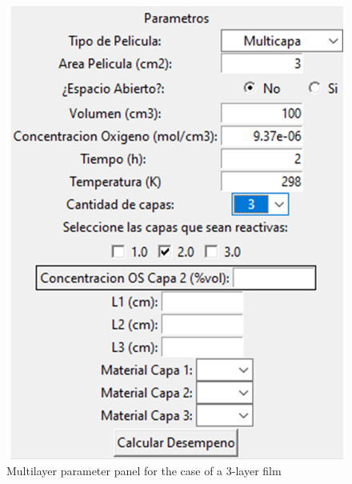 \begin{refsection}
\begin{figure}[H]
    \centering
    \includegraphics[scale=0.6]{Documento_Latex/Imagenes/multilayer_panel.png}
    \caption{Multilayer parameter panel for the case of a 3-layer film}
    \label{fig:multilayer_panel}
\end{figure}

\printbibliography
\end{refsection}